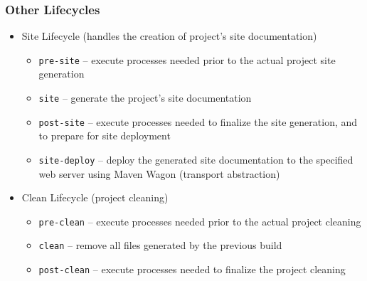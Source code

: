 \documentclass[10pt,xcolor=pdflatex]{beamer}
\begin{document}
\begin{frame}\frametitle{Other Lifecycles}
\begin{itemize}
  \item Site Lifecycle (handles the creation of project's site documentation)
    \begin{itemize}
      \item \texttt{pre-site} -- {\footnotesize execute processes needed prior to the actual project site generation}
      \item \texttt{site} -- {\footnotesize generate the project's site documentation}
      \item \texttt{post-site} -- {\footnotesize execute processes needed to finalize the site generation, and to prepare for site deployment}
      \item \texttt{site-deploy} -- {\footnotesize deploy the generated site documentation to the specified web server using Maven Wagon (transport abstraction)}
    \end{itemize}
  \item Clean Lifecycle (project cleaning)
    \begin{itemize}
      \item \texttt{pre-clean} -- {\footnotesize execute processes needed prior to the actual project cleaning}
      \item \texttt{clean} -- {\footnotesize remove all files generated by the previous build}
      \item \texttt{post-clean} -- {\footnotesize execute processes needed to finalize the project cleaning}
    \end{itemize}
\end{itemize}
\end{frame}
\end{document}
